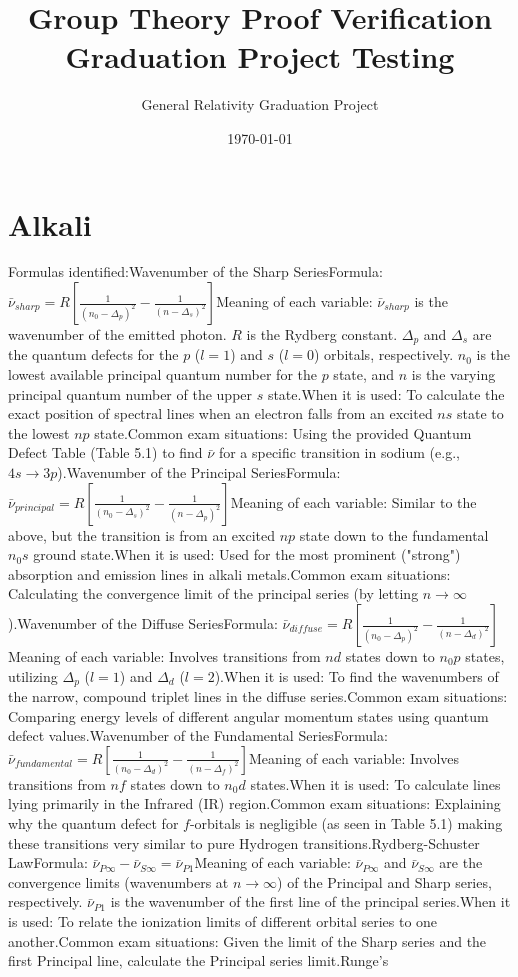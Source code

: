 \documentclass[11pt, a4paper]{report}
\title{\textbf{Group Theory Proof Verification}\\ \Large Graduation Project Testing}
\author{General Relativity Graduation Project}
\date{\today}
\begin{document}
\maketitle
\tableofcontents
\newpage

\chapter{Alkali}
Formulas identified:Wavenumber of the Sharp SeriesFormula: $\bar{\nu}_{sharp} = R \left[ \frac{1}{(n_0 - \Delta_p)^2} - \frac{1}{(n - \Delta_s)^2} \right]$Meaning of each variable: $\bar{\nu}_{sharp}$ is the wavenumber of the emitted photon. $R$ is the Rydberg constant. $\Delta_p$ and $\Delta_s$ are the quantum defects for the $p$ ($l=1$) and $s$ ($l=0$) orbitals, respectively. $n_0$ is the lowest available principal quantum number for the $p$ state, and $n$ is the varying principal quantum number of the upper $s$ state.When it is used: To calculate the exact position of spectral lines when an electron falls from an excited $ns$ state to the lowest $np$ state.Common exam situations: Using the provided Quantum Defect Table (Table 5.1) to find $\bar{\nu}$ for a specific transition in sodium (e.g., $4s \to 3p$).Wavenumber of the Principal SeriesFormula: $\bar{\nu}_{principal} = R \left[ \frac{1}{(n_0 - \Delta_s)^2} - \frac{1}{(n - \Delta_p)^2} \right]$Meaning of each variable: Similar to the above, but the transition is from an excited $np$ state down to the fundamental $n_0 s$ ground state.When it is used: Used for the most prominent ("strong") absorption and emission lines in alkali metals.Common exam situations: Calculating the convergence limit of the principal series (by letting $n \to \infty$).Wavenumber of the Diffuse SeriesFormula: $\bar{\nu}_{diffuse} = R \left[ \frac{1}{(n_0 - \Delta_p)^2} - \frac{1}{(n - \Delta_d)^2} \right]$Meaning of each variable: Involves transitions from $nd$ states down to $n_0 p$ states, utilizing $\Delta_p$ ($l=1$) and $\Delta_d$ ($l=2$).When it is used: To find the wavenumbers of the narrow, compound triplet lines in the diffuse series.Common exam situations: Comparing energy levels of different angular momentum states using quantum defect values.Wavenumber of the Fundamental SeriesFormula: $\bar{\nu}_{fundamental} = R \left[ \frac{1}{(n_0 - \Delta_d)^2} - \frac{1}{(n - \Delta_f)^2} \right]$Meaning of each variable: Involves transitions from $nf$ states down to $n_0 d$ states.When it is used: To calculate lines lying primarily in the Infrared (IR) region.Common exam situations: Explaining why the quantum defect for $f$-orbitals is negligible (as seen in Table 5.1) making these transitions very similar to pure Hydrogen transitions.Rydberg-Schuster LawFormula: $\bar{\nu}_{P\infty} - \bar{\nu}_{S\infty} = \bar{\nu}_{P1}$Meaning of each variable: $\bar{\nu}_{P\infty}$ and $\bar{\nu}_{S\infty}$ are the convergence limits (wavenumbers at $n \to \infty$) of the Principal and Sharp series, respectively. $\bar{\nu}_{P1}$ is the wavenumber of the first line of the principal series.When it is used: To relate the ionization limits of different orbital series to one another.Common exam situations: Given the limit of the Sharp series and the first Principal line, calculate the Principal series limit.Runge's 
\end{document}
